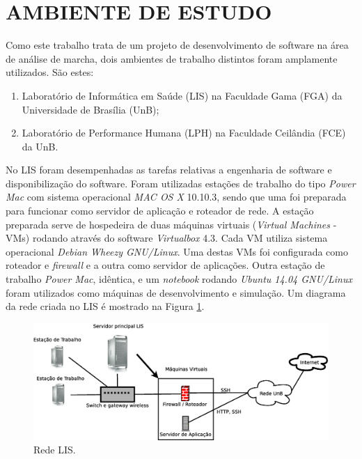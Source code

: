 \section[AMBIENTE DE ESTUDO]{AMBIENTE DE ESTUDO}

Como este trabalho trata de um projeto de desenvolvimento de software na área de análise de marcha, dois ambientes de trabalho distintos foram amplamente utilizados. São estes:

\begin{enumerate}
	\item Laboratório de Informática em Saúde (LIS) na Faculdade Gama (FGA) da Universidade de Brasília (UnB);
	\item Laboratório de Performance Humana (LPH) na Faculdade Ceilândia (FCE) da UnB.
\end{enumerate}

No LIS foram desempenhadas as tarefas relativas a engenharia de software e disponibilização do software.
Foram utilizadas estações de trabalho do tipo \emph{Power Mac} com sistema operacional \emph{MAC OS X} 10.10.3, sendo que uma foi preparada para funcionar como servidor de aplicação e roteador de rede. 
A estação preparada serve de hospedeira de duas máquinas virtuais (\emph{Virtual Machines} - VMs) rodando através do software \emph{Virtualbox} 4.3. 
Cada VM utiliza sistema operacional \emph{Debian Wheezy GNU/Linux}. 
Uma destas VMs foi configurada como roteador e \emph{firewall} e a outra como servidor de aplicações.  
Outra estação de trabalho \emph{Power Mac}, idêntica, e um \emph{notebook} rodando \emph{Ubuntu 14.04 GNU/Linux} foram utilizados como máquinas de desenvolvimento e simulação.
Um diagrama da rede criada no LIS é mostrado na Figura \ref{lis_rede}.

\begin{figure}[ht]
	\centering
	\includegraphics[width=15cm]{figuras/lis_rede.eps}
	\caption{Rede LIS.}
	\label{lis_rede}
\end{figure}

